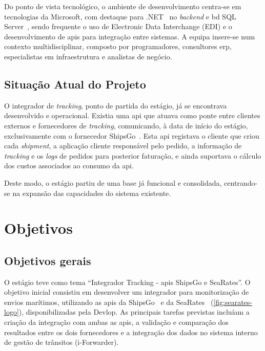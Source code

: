 Do ponto de vista tecnológico, o ambiente de desenvolvimento centra-se em tecnologias da Microsoft, com destaque para .NET~\cite{dotnet} no \textit{backend} e \gls{bd} SQL Server~\cite{sqlserver}, sendo frequente o uso de Electronic Data Interchange (EDI) e o desenvolvimento de \glspl{api} para integração entre sistemas. A equipa insere-se num contexto multidisciplinar, composto por programadores, consultores \gls{erp}, especialistas em infraestrutura e analistas de negócio.

\subsection{Situação Atual do Projeto}

O integrador de \textit{tracking}, ponto de partida do estágio, já se encontrava desenvolvido e operacional. Existia uma \gls{api} que atuava como ponte entre clientes externos e fornecedores de \textit{tracking}, comunicando, à data de início do estágio, exclusivamente com o fornecedor ShipsGo~\cite{shipsgo}. Esta \gls{api} registava o cliente que criou cada \textit{shipment}, a aplicação cliente responsável pelo pedido, a informação de \textit{tracking} e os \textit{logs} de pedidos para posterior faturação, e ainda suportava o cálculo dos custos associados ao consumo da \gls{api}.

Deste modo, o estágio partiu de uma base já funcional e consolidada, centrando-se na expansão das capacidades do sistema existente.

\section{Objetivos}

\subsection{Objetivos gerais}

O estágio teve como tema \enquote{Integrador Tracking - \glspl{api} ShipsGo e SeaRates}. O objetivo inicial consistiu em desenvolver um integrador para monitorização de envios marítimos, utilizando as \glspl{api} da ShipsGo~\cite{shipsgo} e da SeaRates~\cite{searates} (\autoref{fig:searates-logo}), disponibilizadas pela Devlop. As principais tarefas previstas incluíam a criação da integração com ambas as \glspl{api}, a validação e comparação dos resultados entre os dois fornecedores e a integração dos dados no sistema interno de gestão de trânsitos (i-Forwarder).

